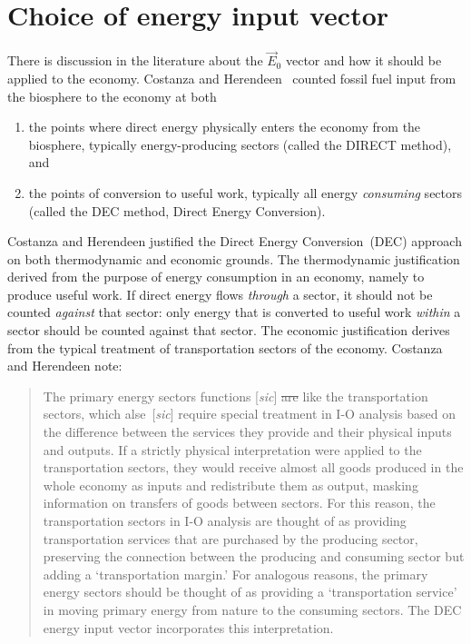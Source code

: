 \section{Choice of energy input vector}
\label{sec:energy_input_vector}


There is discussion in the literature about the $\vec{E}_{0}$
vector and how it should be applied to the economy.
Costanza and Herendeen~\cite{Costanza:1984tq} counted fossil fuel input 
from the biosphere to the economy
at both 

\begin{enumerate}
	\item the points where direct energy physically 
		enters the economy from the biosphere, 
		typically energy-producing sectors
		(called the DIRECT method), and
	\item the points of conversion to useful work, 
		typically all energy \emph{consuming} sectors
		(called the DEC method, 
		Direct Energy Conversion).
\end{enumerate}

Costanza and Herendeen justified the Direct Energy Conversion~(DEC) 
approach on both thermodynamic and economic grounds. 
The thermodynamic justification derived from the purpose 
of energy consumption in an economy, 
namely to produce useful work. 
If direct energy flows \emph{through} a sector, 
it should not be counted \emph{against} that sector: 
only energy that is converted to useful work \emph{within} 
a sector should be counted against that sector.
The economic justification derives 
from the typical treatment of transportation sectors of the economy.
Costanza and Herendeen note:

\begin{quote}
	The primary energy sectors functions [\emph{sic}] \sout{are}
	like the transportation sectors, 
	which alse~[\emph{sic}] require special treatment in I-O analysis 
	based on the difference between the services they provide 
	and their physical inputs and outputs. 
	If a strictly physical interpretation were applied to the 
	transportation sectors, 
	they would receive almost all goods produced in the whole economy as inputs 
	and redistribute them as output, 
	masking information on transfers of goods between sectors. 
	For this reason, the transportation sectors in I-O analysis 
	are thought of as providing transportation services 
	that are purchased by the producing sector, 
	preserving the connection between the producing and consuming sector 
	but adding a `transportation margin.' 
	For analogous reasons, 
	the primary energy sectors should be thought of as providing a 
	`transportation service' in moving primary energy 
	from nature to the consuming sectors. 
	The DEC energy input vector incorporates this interpretation.\cite[p. 151]{Costanza:1984tq}
\end{quote}

